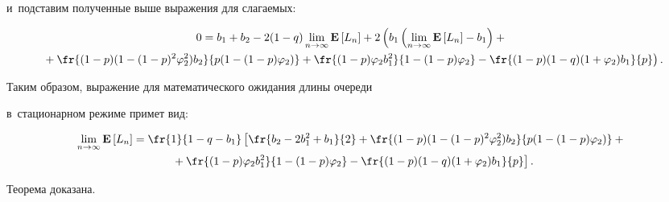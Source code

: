 и~подставим полученные выше выражения для слагаемых:



\vspace*{-9pt}



\noindent

\begin{multline*}

0=b_1+b_2-2(1-q)\lim\limits_{n\to\infty}\mathbf{E}\left[L_n\right]+

2\left(

\vphantom{\fr{(1-p)\varphi_2 b_1^2}{1-(1-p)\varphi_2}}

b_1\left(\lim\limits_{n\to\infty}\mathbf{E}\left[L_n\right]-b_1\right)+{}\right.\\

\left.{}+\fr{(1-p)(1-(1-p)^2\varphi_2^2)b_2}{p(1-(1-p)\varphi_2)}+

\fr{(1-p)\varphi_2 b_1^2}{1-(1-p)\varphi_2}-\fr{(1-p)(1-q)

(1+\varphi_2)b_1}{p}\right).

\end{multline*}

Таким образом, выражение для математического ожидания длины очереди

в~стационарном режиме примет вид:



\vspace*{-4pt}



\noindent

\begin{multline}

\lim\limits_{n\to\infty}\mathbf{E}\left[L_n\right]=

\fr{1}{1-q-b_1}\left[\fr{b_2-2b_1^2+b_1}{2}+\fr{(1-p)(1-(1-p)^2\varphi_2^2)b_2}

{p(1-(1-p)\varphi_2)}+{}\right.\\

\left.{}+\fr{(1-p)\varphi_2 b_1^2}{1-(1-p)\varphi_2}-

\fr{(1-p)(1-q)(1+\varphi_2)b_1}{p}\right].

\label{final}

\end{multline}



\noindent

Теорема доказана.






